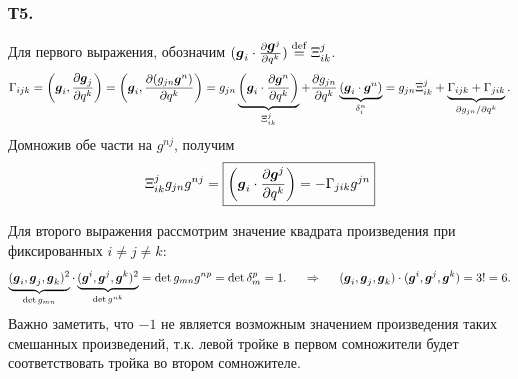 \subsubsection*{Т5.}
Для первого выражения, обозначим $(\mbox{\boldmath $g$}_i \cdot \frac{\partial \mbox{\boldmath $g$}^j}{\partial q^k}) \overset{\mathrm{def}}{=} \Xi_{ik}^j$. 
$$
    \Gamma_{ijk} = \left(\mbox{\boldmath $g$}_i, \frac{\partial \mbox{\boldmath $g$}_j}{\partial q^k}\right) 
    = \left(\mbox{\boldmath $g$}_i, \frac{\partial (g_{jn}\mbox{\boldmath $g$}^n)}{\partial q^k}\right) =
    g_{jn}\underbrace{\left(\mbox{\boldmath $g$}_i \cdot \frac{\partial \mbox{\boldmath $g$}^n}{\partial q^k} \right)}_{\Xi_{ik}^j} +
    \frac{\partial g_{jn}}{\partial q^k} \underbrace{\left(\mbox{\boldmath $g$}_i \cdot \mbox{\boldmath $g$}^n\right)}_{\delta_i^n} = g_{jn} \Xi_{ik}^j + \underbrace{\Gamma_{ijk} + \Gamma_{jik}}_{\partial g_{jn} / \partial q^k}.
$$
Домножив обе части на $g^{nj}$, получим
$$
    \Xi_{ik}^j g_{jn} g^{nj} = \boxed{\left(\mbox{\boldmath $g$}_i \cdot \frac{\partial \mbox{\boldmath $g$}^j}{\partial q^k}\right) = - \Gamma_{jik} g^{jn}}
$$



Для второго выражения рассмотрим значение квадрата произведения при фиксированных $i \neq j \neq k$:
$$
    \underbrace{(\mbox{\boldmath $g$}_i, \mbox{\boldmath $g$}_j, \mbox{\boldmath $g$}_k)^2}_{\det g_{mn}} \cdot 
    \underbrace{(\mbox{\boldmath $g$}^i, \mbox{\boldmath $g$}^j, \mbox{\boldmath $g$}^k)^2}_{\det g^{nk}} = \det g_{mn} g^{np} = \det \delta_m^p = 1.
    \hspace{0.5cm} \Rightarrow \hspace{0.5cm} 
    (\mbox{\boldmath $g$}_i, \mbox{\boldmath $g$}_j, \mbox{\boldmath $g$}_k) \cdot (\mbox{\boldmath $g$}^i, \mbox{\boldmath $g$}^j, \mbox{\boldmath $g$}^k) = 3! = 6.
$$
Важно заметить, что $-1$ не является возможным значением произведения таких смешанных произведений, т.к. левой тройке в первом сомножители будет соответствовать тройка во втором сомножителе.
